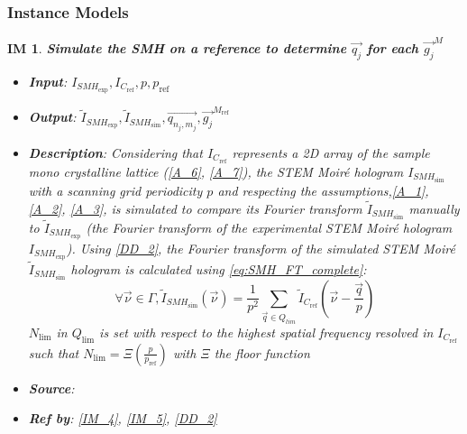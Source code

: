 \documentclass[12pt]{article}
\newtheorem{IM}{IM}
\begin{document}
\subsubsection{Instance Models} \label{sec_instance}    

\renewcommand{\labelitemi}{$-$}

\begin{IM}
\label{IM_1}
\noindent\colorbox{shadecolorIM}{\normalfont \textbf{Simulate the SMH on a 
reference to determine $\overrightarrow{q_{j}}$ for each 
$\overrightarrow{g_j}^{M}$}}
\normalfont
\begin{itemize}
\item \textbf{Input}: $I_{\mathit{SMH}_{\text{exp}}},I_{C_{\text{ref}}}, p, 
p_{\text{ref}}$
\item \textbf{Output}: $\widetilde{I}_{\mathit{SMH}_{\text{exp}}}, 
\widetilde{I}_{\mathit{SMH}_{\text{sim}}}, \overrightarrow{q_{n_j,m_j}}, 
\overrightarrow{g_j}^{M_{\text{ref}}}$
\item \textbf{Description}: Considering that $I_{C_{\text{ref}}}$ represents a 
2D array of the sample mono crystalline lattice (\cref{A_6}, \cref{A_7}), the 
STEM Moir{\'e} hologram $I_{\mathit{SMH}_{\text{sim}}}$ with a scanning grid 
periodicity $p$ and respecting the assumptions,\cref{A_1}, \cref{A_2}, 
\cref{A_3}, is simulated to compare its Fourier transform 
$\widetilde{I}_{\mathit{SMH}_{\text{sim}}}$ manually to 
$\widetilde{I}_{\mathit{SMH}_{\text{exp}}}$ (the Fourier transform of the 
experimental STEM Moir{\'e} hologram $I_{\mathit{SMH}_{\text{exp}}}$). Using 
\cref{DD_2}, the Fourier transform of the simulated STEM Moir{\'e} 
$\widetilde{I}_{\mathit{SMH}_{\text{sim}}}$ hologram is calculated using 
\cref{eq:SMH_FT_complete}:
\begin{equation}
\forall \vec{\nu} \in \Gamma, 
\widetilde{I}_{\mathit{SMH}_{\text{sim}}}(\vec{\nu})=\frac{1}{p^2}\sum_{\vec{q}\in 
Q_{lim}}\widetilde{I}_{C_{\text{ref}}}(\vec{\nu}-\frac{\vec{q}}{p})
\end{equation}
$N_{\text{lim}}$ in $Q_{\text{lim}}$ is set with respect to the highest spatial 
frequency resolved in  $I_{C_{\text{ref}}}$ such that 
$N_{\text{lim}}=\Xi(\frac{p}{p_{\text{ref}}})$ with $\Xi$ the floor function 

\item \textbf{Source}: \cite{Pofelski2017}
\item \textbf{Ref by}: \cref{IM_4}, \cref{IM_5}, \cref{DD_2}
\end{itemize}
\end{IM}
\end{document}
